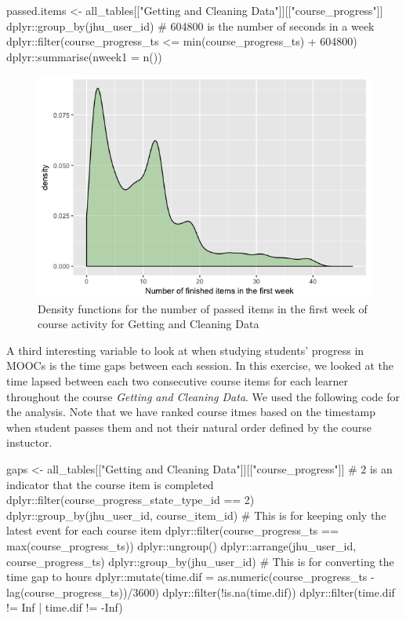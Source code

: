 \begin{Schunk}
\begin{Sinput}
passed.items <- all_tables[["Getting and Cleaning Data"]][["course_progress"]] %
    dplyr::group_by(jhu_user_id) %
    # 604800 is the number of seconds in a week
    dplyr::filter(course_progress_ts <= min(course_progress_ts) + 604800) %
    dplyr::summarise(nweek1 = n())
\end{Sinput}
\end{Schunk}

\begin{figure}[htbp]
    \centering
    \includegraphics[scale=0.5]{passeditems}
    \caption{Density functions for the number of passed items in the first week of course activity for Getting and Cleaning Data}
    \label{figure:passeditems}
\end{figure}

A third interesting variable to look at when studying students' progress
in MOOCs is the time gaps between each session. In this exercise, we
looked at the time lapsed between each two consecutive course items for
each learner throughout the course \emph{Getting and Cleaning Data}. We
used the following code for the analysis. Note that we have ranked
course itmes based on the timestamp when student passes them and not
their natural order defined by the course instuctor.

\begin{Schunk}
\begin{Sinput}
gaps <- all_tables[["Getting and Cleaning Data"]][["course_progress"]] %
    # 2 is an indicator that the course item is completed
    dplyr::filter(course_progress_state_type_id == 2) %
    dplyr::group_by(jhu_user_id, course_item_id) %
    # This is for keeping only the latest event for each course item
    dplyr::filter(course_progress_ts == max(course_progress_ts)) %
    dplyr::ungroup() %
    dplyr::arrange(jhu_user_id, course_progress_ts) %
    dplyr::group_by(jhu_user_id) %
    # This is for converting the time gap to hours
    dplyr::mutate(time.dif = as.numeric(course_progress_ts - 
                                            lag(course_progress_ts))/3600) %
    dplyr::filter(!is.na(time.dif)) %
    dplyr::filter(time.dif != Inf | time.dif != -Inf)
\end{Sinput}
\end{Schunk}

